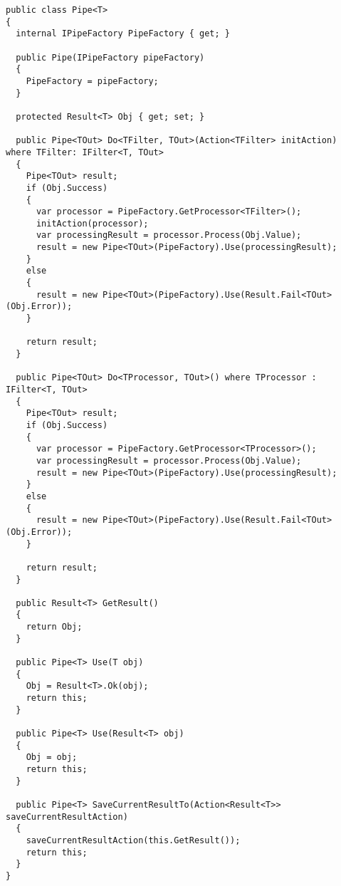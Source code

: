 \begin{lstlisting}[style=fsharpstyle,caption={Определение класса Pipe},label=lst:creation:pipe]
public class Pipe<T>
{
  internal IPipeFactory PipeFactory { get; }

  public Pipe(IPipeFactory pipeFactory)
  {
    PipeFactory = pipeFactory;
  }

  protected Result<T> Obj { get; set; }

  public Pipe<TOut> Do<TFilter, TOut>(Action<TFilter> initAction) where TFilter: IFilter<T, TOut>
  {
    Pipe<TOut> result;
    if (Obj.Success)
    {
      var processor = PipeFactory.GetProcessor<TFilter>();
      initAction(processor);
      var processingResult = processor.Process(Obj.Value);
      result = new Pipe<TOut>(PipeFactory).Use(processingResult);
    }
    else
    {
      result = new Pipe<TOut>(PipeFactory).Use(Result.Fail<TOut>(Obj.Error));
    }

    return result;
  }

  public Pipe<TOut> Do<TProcessor, TOut>() where TProcessor : IFilter<T, TOut>
  {
    Pipe<TOut> result;
    if (Obj.Success)
    {
      var processor = PipeFactory.GetProcessor<TProcessor>();
      var processingResult = processor.Process(Obj.Value);
      result = new Pipe<TOut>(PipeFactory).Use(processingResult);
    }
    else
    {
      result = new Pipe<TOut>(PipeFactory).Use(Result.Fail<TOut>(Obj.Error));
    }

    return result;
  }

  public Result<T> GetResult()
  {
    return Obj;
  }

  public Pipe<T> Use(T obj)
  {
    Obj = Result<T>.Ok(obj);
    return this;
  }

  public Pipe<T> Use(Result<T> obj)
  {
    Obj = obj;
    return this;
  }

  public Pipe<T> SaveCurrentResultTo(Action<Result<T>> saveCurrentResultAction)
  {
    saveCurrentResultAction(this.GetResult());
    return this;
  }
}
\end{lstlisting}

